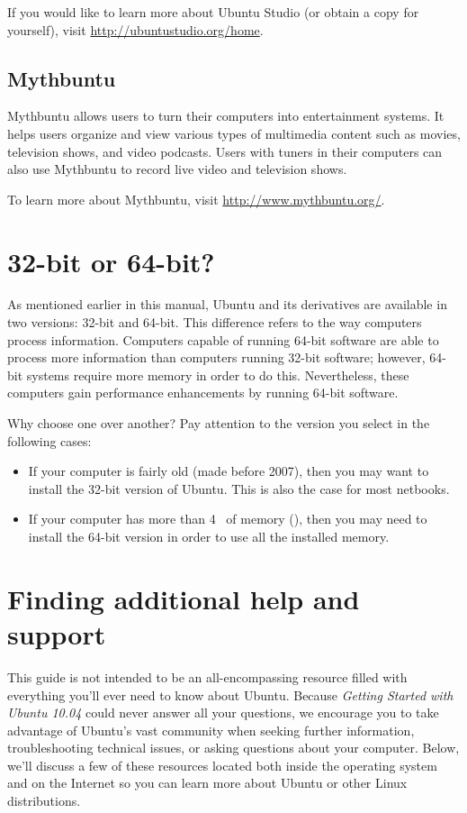If you would like to learn more about Ubuntu Studio (or obtain a copy for yourself), visit \url{http://ubuntustudio.org/home}.

\subsection{Mythbuntu}
\label{sec:mythbuntu}

Mythbuntu allows users to turn their computers into entertainment systems. It helps users organize and view various types of multimedia content such as movies, television shows, and video podcasts. Users with  tuners in their computers can also use Mythbuntu to record live video and television shows.

To learn more about Mythbuntu, visit \url{http://www.mythbuntu.org/}.


\section{32-bit or 64-bit?}
\label{sec:32-or-64}

As mentioned earlier in this manual, Ubuntu and its derivatives are available in two versions: 32-bit and 64-bit. This difference refers to the way computers process information.  Computers capable of running 64-bit software are able to process more information than computers running 32-bit software; however, 64-bit systems require more memory in order to do this.  Nevertheless, these computers gain performance enhancements by running 64-bit software.

Why choose one over another?  Pay attention to the version you select in the following cases:
\begin{itemize}
    \item If your computer is fairly old (made before 2007), then you may want to install the 32-bit version of Ubuntu. This is also the case for most netbooks.
    \item If your computer has more than 4~ of memory (), then you may need to install the 64-bit version in order to use all the installed memory.
\end{itemize}

\section{Finding additional help and support}

This guide is not intended to be an all-encompassing resource filled with everything you'll ever need to know about Ubuntu. Because \emph{Getting Started with Ubuntu 10.04} could never answer all your questions, we encourage you to take advantage of Ubuntu's vast community when seeking further information, troubleshooting technical issues, or asking questions about your computer.  Below, we'll discuss a few of these resources \dash located both inside the operating system and on the Internet \dash so you can learn more about Ubuntu or other Linux distributions.

